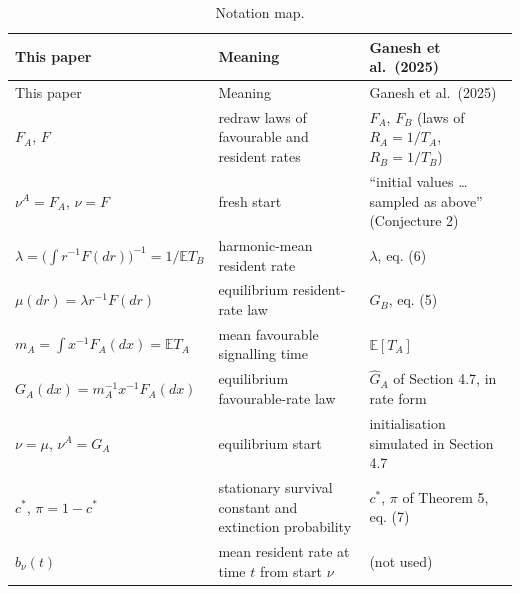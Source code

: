 \documentclass[
  british,
  11pt,
  a4paper,
]{article}
\begin{document}
\begin{longtable}[]{@{}
  >{\raggedright\arraybackslash}p{}
  >{\raggedright\arraybackslash}p{}
  >{\raggedright\arraybackslash}p{}@{}}
\caption{Notation map.}\tabularnewline
\toprule\noalign{}
\begin{minipage}[b]{\linewidth}\raggedright
This paper
\end{minipage} & \begin{minipage}[b]{\linewidth}\raggedright
Meaning
\end{minipage} & \begin{minipage}[b]{\linewidth}\raggedright
Ganesh et al.~(2025)
\end{minipage} \\
\midrule\noalign{}
\endfirsthead
\toprule\noalign{}
\begin{minipage}[b]{\linewidth}\raggedright
This paper
\end{minipage} & \begin{minipage}[b]{\linewidth}\raggedright
Meaning
\end{minipage} & \begin{minipage}[b]{\linewidth}\raggedright
Ganesh et al.~(2025)
\end{minipage} \\
\midrule\noalign{}
\endhead
\bottomrule\noalign{}
\endlastfoot
\(F_A\), \(F\) & redraw laws of favourable and resident rates & \(F_A\),
\(F_B\) (laws of \(R_A=1/T_A\), \(R_B=1/T_B\)) \\
\(\nu^A=F_A\), \(\nu=F\) & fresh start & ``initial values \ldots{}
sampled as above'' (Conjecture 2) \\
\(\lambda=\bigl(\int r^{-1}F(dr)\bigr)^{-1}=1/\mathbb E T_B\) &
harmonic-mean resident rate & \(\lambda\), eq. (6) \\
\(\mu(dr)=\lambda r^{-1}F(dr)\) & equilibrium resident-rate law &
\(G_B\), eq. (5) \\
\(m_A=\int x^{-1}F_A(dx)=\mathbb E T_A\) & mean favourable signalling
time & \(\mathbb E[T_A]\) \\
\(G_A(dx)=m_A^{-1}x^{-1}F_A(dx)\) & equilibrium favourable-rate law &
\(\hat G_A\) of Section 4.7, in rate form \\
\(\nu=\mu\), \(\nu^A=G_A\) & equilibrium start & initialisation
simulated in Section 4.7 \\
\(c^\ast\), \(\pi=1-c^\ast\) & stationary survival constant and
extinction probability & \(c^\ast\), \(\pi\) of Theorem 5, eq. (7) \\
\(b_\nu(t)\) & mean resident rate at time \(t\) from start \(\nu\) &
(not used) \\
\end{longtable}
\end{document}
